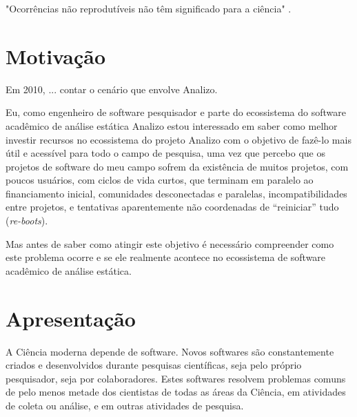 
"Ocorrências não reprodutíveis não têm significado para a ciência" \cite{popper2004logica}.

\section{Motivação}

Em 2010, ... contar o cenário que envolve Analizo.

Eu, como engenheiro de software pesquisador e parte do ecossistema do software
acadêmico de análise estática Analizo estou interessado em saber como melhor
investir recursos no ecossistema do projeto Analizo com o objetivo de fazê-lo
mais útil e acessível para todo o campo de pesquisa, uma vez que percebo que os
projetos de software do meu campo sofrem da existência de muitos projetos, com
poucos usuários, com ciclos de vida curtos, que terminam em paralelo ao
financiamento inicial, comunidades desconectadas e paralelas,
incompatibilidades entre projetos, e tentativas aparentemente não coordenadas
de ``reiniciar'' tudo ({\it re-boots}).

Mas antes de saber como atingir este objetivo é necessário compreender como
este problema ocorre e se ele realmente acontece no ecossistema de software
acadêmico de análise estática.


%


\section{Apresentação}

A Ciência moderna depende de software. Novos softwares são constantemente
criados e desenvolvidos durante pesquisas científicas, seja pelo próprio pesquisador,
seja por colaboradores. 
Estes softwares resolvem problemas comuns de pelo menos metade dos cientistas 
de todas as áreas da Ciência, em atividades de coleta ou análise, 
e em outras atividades de pesquisa.

